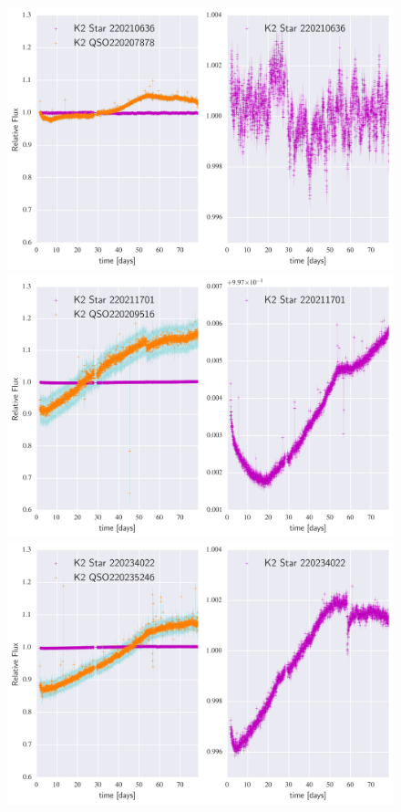 \documentclass[a4paper,fleqn,usenatbib]{mnras}
\begin{document}
        \begin{figure}
 	\includegraphics[width=\columnwidth]{220207878NearestNeighbor.png}
 	\includegraphics[width=\columnwidth]{220209516NearestNeighbor.png}
 	\includegraphics[width=\columnwidth]{220235246NearestNeighbor.png}
        	\caption{}
        	\label{fig:example_figure}
        \end{figure}      
        
\end{document}

